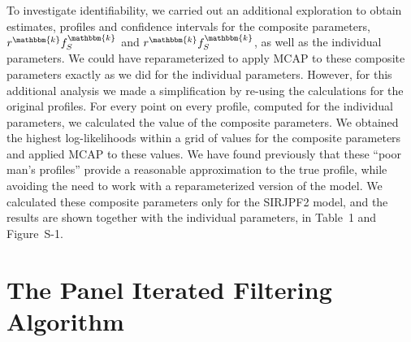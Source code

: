 \documentclass[aoas,preprint]{imsart}\usepackage[]{graphicx}\usepackage[]{xcolor}
\newcommand\species{\mathbbm{k}}
\begin{document}
To investigate identifiability, we carried out an additional exploration to obtain estimates, profiles and confidence intervals for the composite parameters,  $r^{\species}f^{\species}_{S}$ and $r^{\species}f^{\species}_{S}$, as well as the individual parameters.
We could have reparameterized to apply MCAP to these composite parameters exactly as we did for the individual parameters.
However, for this additional analysis we made a simplification by re-using the calculations for the original profiles.
For every point on every profile, computed for the individual parameters, we calculated the value of the composite parameters.
We obtained the highest log-likelihoods within a grid of values for the composite parameters and applied MCAP to these values.
We have found previously that these ``poor man's profiles'' provide a reasonable approximation to the true profile, while avoiding the need to work with a reparameterized version of the model.
We calculated these composite parameters only for the SIRJPF2 model, and the results are shown together with the individual parameters, in Table~1 and Figure~S-1.

\section{The Panel Iterated Filtering Algorithm}
\end{document}

